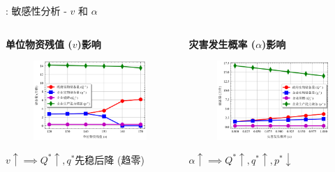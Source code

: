 \documentclass[9pt]{beamer}
\begin{document}
\begin{frame}{\insertsectionhead: 敏感性分析 - $v$ 和 $\alpha$}
    \begin{columns}[T]
        \begin{column}{0.5\textwidth}
            \textbf{单位物资残值 ($v$)影响}
            \begin{figure}
                \includegraphics[width=\linewidth]{basic_pictures/sensitivity_v.png}
                \caption*{}
            \end{figure}
            \footnotesize $v \uparrow \implies Q^* \uparrow, q^*$先稳后降 (趋零)
        \end{column}
        \begin{column}{0.5\textwidth}
            \textbf{灾害发生概率 ($\alpha$)影响}
            \begin{figure}
                \includegraphics[width=\linewidth]{basic_pictures/sensitivity_alpha.png}
                \caption*{}
            \end{figure}
            \footnotesize $\alpha \uparrow \implies Q^* \uparrow, q^* \uparrow, p^* \downarrow$
        \end{column}
    \end{columns}
\end{frame}
\end{document}
